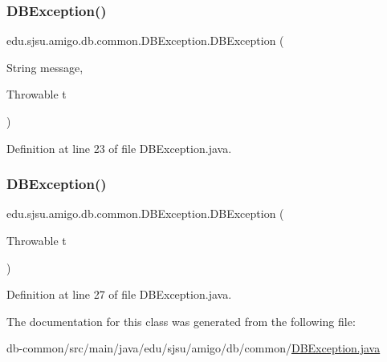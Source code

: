 \subsubsection{\texorpdfstring{D\+B\+Exception()}{DBException()}\hspace{0.1cm}{\footnotesize\ttfamily [1/2]}}
{\footnotesize\ttfamily edu.\+sjsu.\+amigo.\+db.\+common.\+D\+B\+Exception.\+D\+B\+Exception (\begin{DoxyParamCaption}\item[{String}]{message,  }\item[{Throwable}]{t }\end{DoxyParamCaption})}



Definition at line 23 of file D\+B\+Exception.\+java.

\mbox{\label{classedu_1_1sjsu_1_1amigo_1_1db_1_1common_1_1_d_b_exception_a878f8f4e07c6a42bfb6dc8bae41bf2b4}} 
\subsubsection{\texorpdfstring{D\+B\+Exception()}{DBException()}\hspace{0.1cm}{\footnotesize\ttfamily [2/2]}}
{\footnotesize\ttfamily edu.\+sjsu.\+amigo.\+db.\+common.\+D\+B\+Exception.\+D\+B\+Exception (\begin{DoxyParamCaption}\item[{Throwable}]{t }\end{DoxyParamCaption})}



Definition at line 27 of file D\+B\+Exception.\+java.



The documentation for this class was generated from the following file\+:\begin{DoxyCompactItemize}
\item 
db-\/common/src/main/java/edu/sjsu/amigo/db/common/\hyperlink{_d_b_exception_8java}{D\+B\+Exception.\+java}\end{DoxyCompactItemize}
